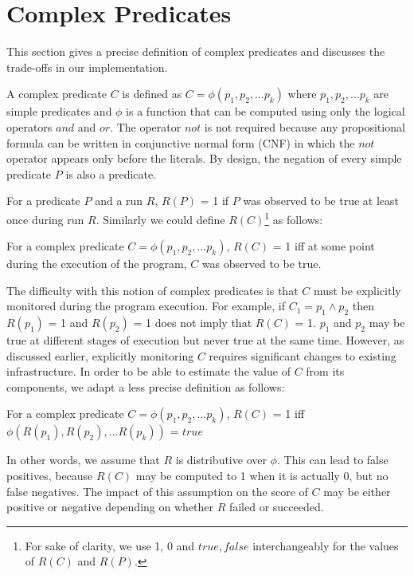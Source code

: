 \section{Complex Predicates}
\label{sec-complex-preds}
This section gives a precise definition of complex predicates and discusses the trade-offs in our implementation.

A complex predicate $C$ is defined as $C = \phi(p_1, p_2, \ldots p_k)$ where $p_1, p_2, \ldots p_k$ are simple predicates and $\phi$ is a function that can be computed using only the logical operators $and$ and $or$.  The operator $not$ is not required because any propositional formula can be written in conjunctive normal form (CNF) in which the $not$ operator appears only before the literals.  By design, the negation of every simple predicate $P$ is also a predicate.

For a predicate $P$ and a run $R$, $R(P)$ = 1 if $P$ was observed to be true at least once during run $R$.  Similarly we could define $R(C)${\footnote{For sake of clarity, we use 1, 0 and $true, false$ interchangeably for the values of $R(C)$ and $R(P)$.}} as follows:
\begin{defn}
\label{dfn1}
For a complex predicate $C = \phi(p_1, p_2, \ldots p_k)$, $R(C)$ = 1 iff at some point during the execution of the program, $C$ was observed to be true.
\end{defn}

The difficulty with this notion of complex predicates is that $C$ must be explicitly monitored during the program execution.  For example, if $C_1 = p_1 \wedge p_2$ then $R(p_1)$ = 1 and $R(p_2)$ = 1 does not imply that $R(C)$ = 1.  $p_1$ and $p_2$ may be true at different stages of execution but never true at the same time.  However, as discussed earlier, explicitly monitoring $C$ requires significant changes to existing infrastructure.  In order to be able to estimate the value of $C$ from its components, we adapt a less precise definition as follows:
\begin{defn}
\label{dfn2}
For a complex predicate $C = \phi(p_1, p_2, \ldots p_k)$, $R(C)$ = 1 iff $\phi(R(p_1), R(p_2), \ldots R(p_k))$ = $true$
\end{defn}

In other words, we assume that $R$ is distributive over $\phi$.  This can lead to false positives, because $R(C)$ may be computed to 1 when it is actually 0, but no false negatives.  The impact of this assumption on the score of $C$ may be either positive or negative depending on whether $R$ failed or succeeded.


